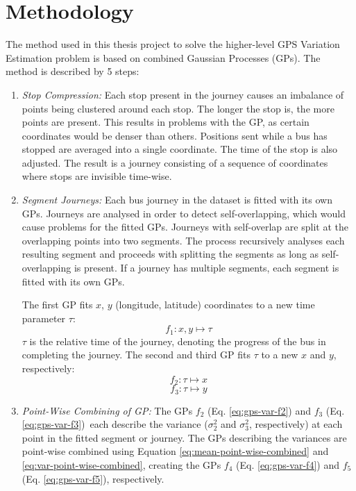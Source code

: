 \section{Methodology}

The method used in this thesis project to solve the higher-level GPS Variation Estimation problem is based on combined Gaussian Processes (GPs).
The method is described by 5 steps:

\begin{enumerate}
    \item \textit{Stop Compression:}
    Each stop present in the journey causes an imbalance of points being clustered around each stop.
    The longer the stop is, the more points are present.
    This results in problems with the GP, as certain coordinates would be denser than others.
    Positions sent while a bus has stopped are averaged into a single coordinate.
    The time of the stop is also adjusted.
    The result is a journey consisting of a sequence of coordinates where stops are invisible time-wise.

    \item \textit{Segment Journeys:}
    Each bus journey in the dataset is fitted with its own GPs.
    Journeys are analysed in order to detect self-overlapping, which would cause problems for the fitted GPs.
    Journeys with self-overlap are split at the overlapping points into two segments.
    The process recursively analyses each resulting segment and proceeds with splitting the segments as long as self-overlapping is present.
    If a journey has multiple segments, each segment is fitted with its own GPs.

    The first GP fits $x$, $y$ (longitude, latitude) coordinates to a new time parameter $\tau$:
    \begin{equation} \label{eq:gps-var-f1}
       f_1: x, y \longmapsto \tau
    \end{equation}
    $\tau$ is the relative time of the journey, denoting the progress of the bus in completing the journey.
    The second and third GP fits $\tau$ to a new $x$ and $y$, respectively:
    \begin{equation} \label{eq:gps-var-f2}
        f_2: \tau \longmapsto x
    \end{equation}
    \begin{equation} \label{eq:gps-var-f3}
        f_3: \tau \longmapsto y
    \end{equation}

    \item \textit{Point-Wise Combining of GP:}
    The GPs $f_2$ (Eq. \ref{eq:gps-var-f2}) and $f_3$ (Eq. \ref{eq:gps-var-f3}) each describe the variance ($\sigma_2^2$ and $\sigma_3^2$, respectively) at each point in the fitted segment or journey.
    The GPs describing the variances are point-wise combined using Equation \ref{eq:mean-point-wise-combined} and \ref{eq:var-point-wise-combined}, creating the GPs $f_4$ (Eq. \ref{eq:gps-var-f4}) and $f_5$ (Eq. \ref{eq:gps-var-f5}), respectively.
    

\end{enumerate}
